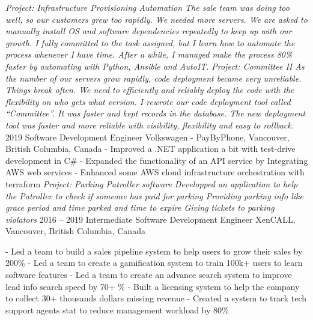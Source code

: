 \documentclass[9pt]{developercv} %
\begin{document}
\begin{entrylist}
{            \textit{Project: Infrastructure Provisioning Automation\newline
            The sale team was doing too well, so our customers grew too rapidly. We needed more servers.  
            We are asked to manually install OS and software dependencies repeatedly to keep up with our growth. I fully committed to the task assigned, but I learn how to automate the process whenever I have time. After a while, I managed make the process 80\% faster by automating with Python, Ansible and AutoIT.\newline\newline}
            \textit{Project: Committee II\newline
            As the number of our servers grow rapidly, code deployment became very unreliable. Things break often. We need to efficiently and reliably deploy the code with the flexibility on who gets what version. I rewrote our code deployment tool called “Committee”. It was faster and kept records in the database. The new deployment tool was faster and more reliable with visibility, flexibility and easy to rollback.\newline}
        }
		\entry
		{2019}
		{Software Development Engineer}
		{Volkswagen - PayByPhone, Vancouver, British Columbia, Canada}
		{
            - Improved a .NET application a bit with test-drive development in C\#\newline
            - Expanded the functionality of an API service by Integrating AWS web services\newline 
            - Enhanced some AWS cloud infrastructure orchestration with terraform\newline\newline
			\textit{Project: Parking Patroller software\newline
            Developped an application to help the Patroller to check if someone has paid for parking
            Providing parking info like grace period and time parked and time to expire
            Giving tickets to parking violators \newline}
        }
	\entry
		{2016 -- 2019}
		{Intermediate Software Development Engineer}
		{XenCALL, Vancouver, British Columbia, Canada}
		{
            - Led a team to build a sales pipeline system to help users to grow their sales by 200\%\newline
            - Led a team to create a gamification system to train 100k+ users to learn software features\newline
            - Led a team to create an advance search system to improve lead info search speed by 70+ \%\newline
            - Built a licensing system to help the company to collect 30+ thousands dollars missing revenue\newline
            - Created a system to track tech support agents stat to reduce management workload by 80\%\newline

}
\end{entrylist}
\end{document}
